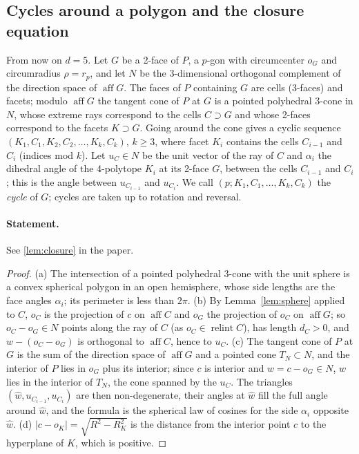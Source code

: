 \documentclass[11pt]{article}
\theoremstyle{definition}
\theoremstyle{remark}
\newcommand{\aff}{\operatorname{aff}}
\newcommand{\relint}{\operatorname{relint}}
\begin{document}
\subsection{Cycles around a polygon and the closure equation}
\label{sec:closure}

From now on $d=5$. Let $G$ be a 2-face of $P$, a $p$-gon with circumcenter
$o_G$ and circumradius $\rho=r_p$, and let $N$ be the 3-dimensional
orthogonal complement of the direction space of $\aff G$. The faces of $P$
containing $G$ are cells (3-faces) and facets; modulo $\aff G$ the tangent
cone of $P$ at $G$ is a pointed polyhedral 3-cone in $N$, whose extreme
rays correspond to the cells $C\supset G$ and whose 2-faces correspond to
the facets $K\supset G$. Going around the cone gives a cyclic sequence
$(K_1,C_1,K_2,C_2,\dots,K_k,C_k)$, $k\ge3$, where facet $K_i$ contains the
cells $C_{i-1}$ and $C_i$ (indices mod $k$). Let $u_C\in N$ be the unit
vector of the ray of $C$ and $\alpha_i$ the dihedral angle of the
4-polytope $K_i$ at its 2-face $G$, between the cells $C_{i-1}$ and $C_i$;
this is the angle between $u_{C_{i-1}}$ and $u_{C_i}$. We call
$(p;K_1,C_1,\dots,K_k,C_k)$ the \emph{cycle} of $G$; cycles are taken up to
rotation and reversal.

\paragraph{Statement.} See \ref{lem:closure} in the paper.


\begin{proof}
(a) The intersection of a pointed polyhedral 3-cone with the unit sphere
is a convex spherical polygon in an open hemisphere, whose side lengths
are the face angles $\alpha_i$; its perimeter is less than $2\pi$.
(b) By Lemma~\ref{lem:sphere} applied to $C$, $o_C$ is the projection of
$c$ on $\aff C$ and $o_G$ the projection of $o_C$ on $\aff G$; so
$o_C-o_G\in N$ points along the ray of $C$ (as $o_C\in\relint C$), has
length $d_C>0$, and $w-(o_C-o_G)$ is orthogonal to $\aff C$, hence to
$u_C$. (c) The tangent cone of $P$ at $G$ is the sum of the direction
space of $\aff G$ and a pointed cone $T_N\subset N$, and the interior of
$P$ lies in $o_G$ plus its interior; since $c$ is interior and $w=c-o_G\in
N$, $w$ lies in the interior of $T_N$, the cone spanned by the $u_C$. The triangles $(\hat w,u_{C_{i-1}},u_{C_i})$ are then
non-degenerate, their angles at $\hat w$ fill the full angle around
$\hat w$, and the formula is the spherical law of cosines for the side
$\alpha_i$ opposite $\hat w$. (d) $|c-o_K|=\sqrt{R^2-R_K^2}$ is the
distance from the interior point $c$ to the hyperplane of $K$, which is
positive.
\end{proof}
\end{document}
